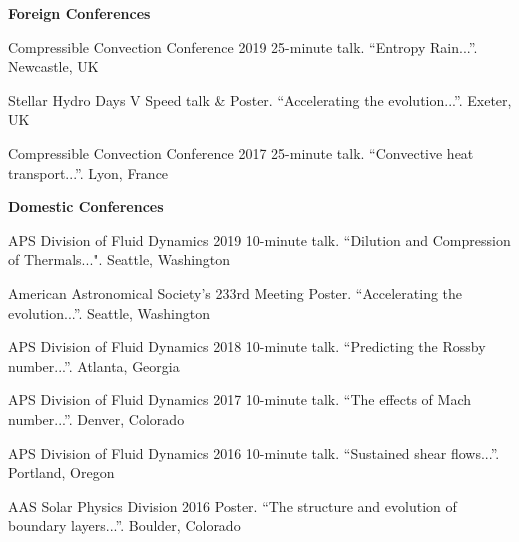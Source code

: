 

\normalsize
\textbf{Foreign Conferences}
\vspace{-0.6cm}\newline
\footnotesize
\begin{cvhonors}
  \cvhonor
    {Compressible Convection Conference 2019} %
    {25-minute talk. ``Entropy Rain...''.} %
    {Newcastle, UK} %
    {} %

  \cvhonor
    {Stellar Hydro Days V} %
    {Speed talk \& Poster. ``Accelerating the evolution...''.} %
    {Exeter, UK} %
    {} %

  \cvhonor
    {Compressible Convection Conference 2017} %
    {25-minute talk. ``Convective heat transport...''.} %
    {Lyon, France} %
    {} %

\end{cvhonors}
\normalsize
\textbf{Domestic Conferences}
\vspace{-0.5cm}\newline
\footnotesize
\begin{cvhonors}
  \cvhonor
    {APS Division of Fluid Dynamics 2019} %
    {10-minute talk. ``Dilution and Compression of Thermals...".} %
    {Seattle, Washington} %
    {} %

  \cvhonor
    {American Astronomical Society's 233rd Meeting} %
    {Poster. ``Accelerating the evolution...''.} %
    {Seattle, Washington} %
    {} %

  \cvhonor
    {APS Division of Fluid Dynamics 2018} %
    {10-minute talk. ``Predicting the Rossby number...''.} %
    {Atlanta, Georgia} %
    {} %

  \cvhonor
    {APS Division of Fluid Dynamics 2017} %
    {10-minute talk. ``The effects of Mach number...''.} %
    {Denver, Colorado} %
    {} %

  \cvhonor
    {APS Division of Fluid Dynamics 2016} %
    {10-minute talk. ``Sustained shear flows...''.} %
    {Portland, Oregon} %
    {} %

  \cvhonor
    {AAS Solar Physics Division 2016} %
    {Poster. ``The structure and evolution of boundary layers...''.} %
    {Boulder, Colorado} %
    {} %


\end{cvhonors}
\normalsize
